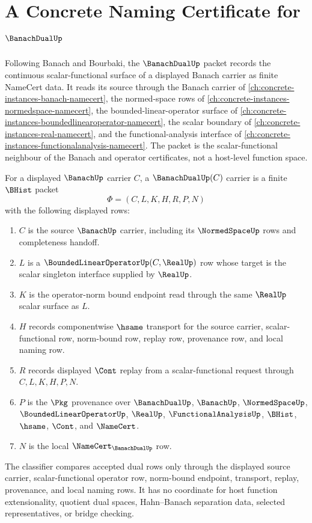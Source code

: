 \chapter{A Concrete Naming Certificate for $\BanachDualUp$}
\label{ch:concrete-instances-banach-dual-namecert}

Following Banach and Bourbaki, the $\BanachDualUp$ packet records the continuous scalar-functional surface of a displayed Banach carrier as finite NameCert data. It reads its source through the Banach carrier of \autoref{ch:concrete-instances-banach-namecert}, the normed-space rows of \autoref{ch:concrete-instances-normedspace-namecert}, the bounded-linear-operator surface of \autoref{ch:concrete-instances-boundedlinearoperator-namecert}, the scalar boundary of \autoref{ch:concrete-instances-real-namecert}, and the functional-analysis interface of \autoref{ch:concrete-instances-functionalanalysis-namecert}. The packet is the scalar-functional neighbour of the Banach and operator certificates, not a host-level function space.

\begin{definition}
\label{def:banach-dual-carrier}
For a displayed $\BanachUp$ carrier $C$, a $\BanachDualUp(C)$ carrier is a finite $\BHist$ packet
$$
\Phi=(C,L,K,H,R,P,N)
$$
with the following displayed rows:
\begin{enumerate}
\item $C$ is the source $\BanachUp$ carrier, including its $\NormedSpaceUp$ rows and completeness handoff.
\item $L$ is a $\BoundedLinearOperatorUp(C,\RealUp)$ row whose target is the scalar singleton interface supplied by $\RealUp$.
\item $K$ is the operator-norm bound endpoint read through the same $\RealUp$ scalar surface as $L$.
\item $H$ records componentwise $\hsame$ transport for the source carrier, scalar-functional row, norm-bound row, replay row, provenance row, and local naming row.
\item $R$ records displayed $\Cont$ replay from a scalar-functional request through $C,L,K,H,P,N$.
\item $P$ is the $\Pkg$ provenance over $\BanachDualUp$, $\BanachUp$, $\NormedSpaceUp$, $\BoundedLinearOperatorUp$, $\RealUp$, $\FunctionalAnalysisUp$, $\BHist$, $\hsame$, $\Cont$, and $\NameCert$.
\item $N$ is the local $\NameCert_{\BanachDualUp}$ row.
\end{enumerate}
The classifier compares accepted dual rows only through the displayed source carrier, scalar-functional operator row, norm-bound endpoint, transport, replay, provenance, and local naming rows. It has no coordinate for host function extensionality, quotient dual spaces, Hahn--Banach separation data, selected representatives, or bridge checking.
\end{definition}


